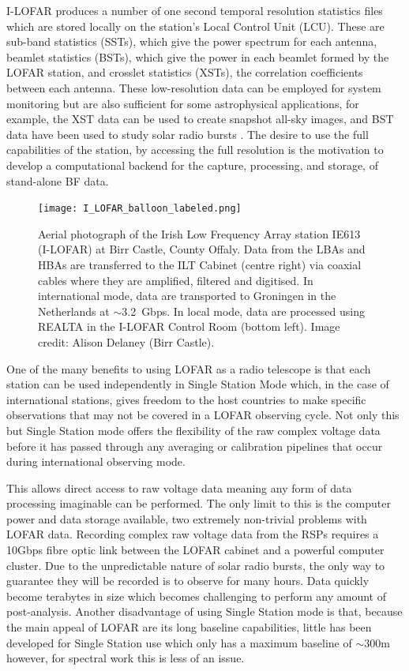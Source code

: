 I-LOFAR produces a number of one second temporal resolution statistics files which are stored locally on the station's Local Control Unit (LCU). These are sub-band statistics (SSTs), which give the power spectrum for each antenna, beamlet statistics (BSTs), which give the power in each beamlet formed by the LOFAR station, and crosslet statistics (XSTs), the correlation coefficients between each antenna. These low-resolution data can be employed for system monitoring but are also sufficient for some astrophysical applications, for example, the XST data can be used to create snapshot all-sky images, and BST data have been used to study solar radio bursts \citep{Maguire2020}. The desire to use the full capabilities of the station, by accessing the full resolution is the motivation to develop a computational backend for the capture,  processing, and storage, of stand-alone BF data. 


\begin{figure}[ht]
    \centering
    \texttt{[image: I\_LOFAR\_balloon\_labeled.png]}
    \caption[Aerial photograph of the Irish Low Frequency Array station IE613 (I-LOFAR) at Birr Castle, County Offaly.]{Aerial photograph of the Irish Low Frequency Array station IE613 (I-LOFAR) at Birr Castle, County Offaly. Data from the LBAs and HBAs are transferred to the ILT Cabinet (centre right) via coaxial cables where they are amplified, filtered and digitised. In international mode, data are transported to Groningen in the Netherlands at $\sim$3.2~Gbps. In local mode, data are processed using REALTA in the I-LOFAR Control Room (bottom left). Image credit: Alison Delaney (Birr Castle).}
    \label{fig:ILOFAR}
\end{figure}


One of the many benefits to using LOFAR as a radio telescope is that each station can be used independently in Single Station Mode which, in the case of international stations, gives freedom to the host countries to make specific observations that may not be covered in a LOFAR observing cycle. Not only this but Single Station mode offers the flexibility of the raw complex voltage data before it has passed through any averaging or calibration pipelines that occur during international observing mode.

This allows direct access to raw voltage data meaning any form of data processing imaginable can be performed. The only limit to this is the computer power and data storage available, two extremely non-trivial problems with LOFAR data. Recording complex raw voltage data from the RSPs requires a 10Gbps fibre optic link between the LOFAR cabinet and a powerful computer cluster. Due to the unpredictable nature of solar radio bursts, the only way to guarantee they will be recorded is to observe for many hours. Data quickly become terabytes in size which becomes challenging to perform any amount of post-analysis.
Another disadvantage of using Single Station mode is that, because the main appeal of LOFAR are its long baseline capabilities, little has been developed for Single Station use which only has a maximum baseline of $\sim 300$m however, for spectral work this is less of an issue.


